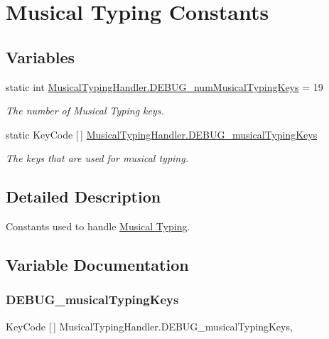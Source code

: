 \hypertarget{group___mus_typ_const}{}\section{Musical Typing Constants}
\label{group___mus_typ_const}
\subsection*{Variables}
\begin{DoxyCompactItemize}
\item 
static int \hyperlink{group___mus_typ_const_ga1a5182f5dda1cd3a5b400911a3f4cb69}{Musical\+Typing\+Handler.\+D\+E\+B\+U\+G\+\_\+num\+Musical\+Typing\+Keys} = 19
\begin{DoxyCompactList}\small\item\em The number of Musical Typing keys. \end{DoxyCompactList}\item 
static Key\+Code \mbox{[}$\,$\mbox{]} \hyperlink{group___mus_typ_const_gad8b9000a0b6c93d23310f54d07dd0b90}{Musical\+Typing\+Handler.\+D\+E\+B\+U\+G\+\_\+musical\+Typing\+Keys}
\begin{DoxyCompactList}\small\item\em The keys that are used for musical typing. \end{DoxyCompactList}\end{DoxyCompactItemize}


\subsection{Detailed Description}
Constants used to handle \hyperlink{group___mus_typ}{Musical Typing}. 

\subsection{Variable Documentation}
\mbox{\label{group___mus_typ_const_gad8b9000a0b6c93d23310f54d07dd0b90}} 
\subsubsection{\texorpdfstring{D\+E\+B\+U\+G\+\_\+musical\+Typing\+Keys}{DEBUG\_musicalTypingKeys}}
{\footnotesize\ttfamily Key\+Code \mbox{[}$\,$\mbox{]} Musical\+Typing\+Handler.\+D\+E\+B\+U\+G\+\_\+musical\+Typing\+Keys\hspace{0.3cm}{\ttfamily [static]}, {\ttfamily [private]}}

